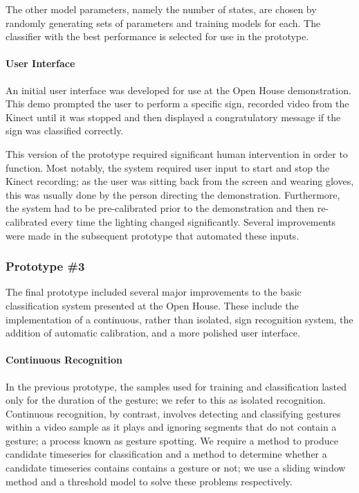 \documentclass[12pt]{article}
\begin{document}
The other model parameters, namely the number of states, are chosen by randomly generating sets of parameters and training models for each. The classifier with the best performance is selected for use in the prototype.

\paragraph{User Interface}
An initial user interface was developed for use at the Open House demonstration. This demo prompted the user to perform a specific sign, recorded video from the Kinect until it was stopped and then displayed a congratulatory message if the sign was classified correctly. 

This version of the prototype required significant human intervention in order to function. Most notably, the system required user input to start and stop the Kinect recording; as the user was sitting back from the screen and wearing gloves, this was usually done by the person directing the demonstration. Furthermore, the system had to be pre-calibrated prior to the demonstration and then re-calibrated every time the lighting changed significantly. Several improvements were made in the subsequent prototype that automated these inputs. 

\subsubsection{Prototype \#3}
The final prototype included several major improvements to the basic classification system presented at the Open House. These include the implementation of a continuous, rather than isolated, sign recognition system, the addition of automatic calibration, and a more polished user interface. 

\paragraph{Continuous Recognition}
In the previous prototype, the samples used for training and classification lasted only for the duration of the gesture; we refer to this as isolated recognition. Continuous recognition, by contrast, involves detecting and classifying gestures within a video sample as it plays and ignoring segments that do not contain a gesture; a process known as gesture spotting. We require a method to produce candidate timeseries for classification and a method to determine whether a candidate timeseries contains contains a gesture or not; we use a sliding window method and a threshold model to solve these problems respectively. 
\end{document}
